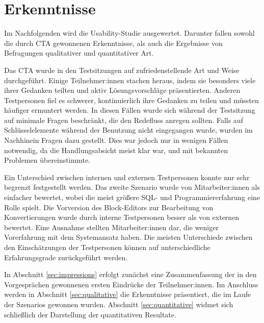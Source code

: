 \section{Erkenntnisse}

Im Nachfolgenden wird die Usability-Studie ausgewertet. Darunter fallen sowohl die durch \acs{CTA} gewonnenen Erkenntnisse, als auch die Ergebnisse von Befragungen qualitativer und quantitativer Art.

Das \ac{CTA} wurde in den Testsitzungen auf zufriedenstellende Art und Weise durchgeführt. Einige Teilnehmer:innen stachen heraus, indem sie besonders viele ihrer Gedanken teilten und aktiv Lösungsvorschläge präsentierten. Anderen Testpersonen fiel es schwerer, kontinuierlich ihre Gedanken zu teilen und müssten häufiger ermuntert werden. In diesen Fällen wurde sich während der Testsitzung auf minimale Fragen beschränkt, die den Redefluss anregen sollten. Falls auf Schlüsselelemente während der Benutzung nicht eingegangen wurde, wurden im Nachhinein Fragen dazu gestellt. Dies war jedoch nur in wenigen Fällen notwendig, da die Handlungsabsicht meist klar war, und mit bekannten Problemen übereinstimmte.

Ein Unterschied zwischen internen und externen Testpersonen konnte nur sehr begrenzt festgestellt werden. Das zweite Szenario wurde von Mitarbeiter:innen als einfacher bewertet, wobei die meist größere \ac{SQL}- und Programmiererfahrung eine Rolle spielt. Die Vorversion des Block-Editors zur Bearbeitung von Konvertierungen wurde durch interne Testpersonen besser als von externen bewertet. Eine Ausnahme stellten Mitarbeiter:innen dar, die weniger Vorerfahrung mit dem Systemansatz haben. Die meisten Unterschiede zwischen den Einschätzungen der Testpersonen können auf unterschiedliche  Erfahrungsgrade zurückgeführt werden.

In Abschnitt \ref{sec:impressions} erfolgt zunächst eine Zusammenfassung der in den Vorgesprächen gewonnenen ersten Eindrücke der Teilnehmer:innen. Im Anschluss werden in Abschnitt \ref{sec:qualitative} die Erkenntnisse präsentiert, die im Laufe der Szenarios gewonnen wurden. Abschnitt \ref{sec:quantitative} widmet sich schließlich der Darstellung der quantitativen Resultate.
